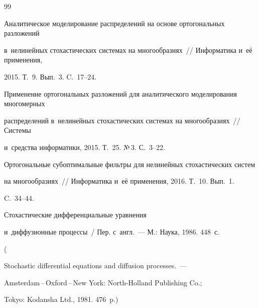 {\small\frenchspacing

{%


\begin{thebibliography}{99}



\vspace*{-2pt}





Аналитическое моделирование распределений на основе ортогональных разложений 

в~нелинейных стохастических системах на многообразиях~/\!\!/ Информатика и~её применения, 

2015. Т.~9. Вып.~3. C.~17--24.







Применение ортогональных разложений для аналитического моделирования многомерных 

распределений в~нелинейных стохастических системах на многообразиях~/\!\!/ Системы 

и~средства информатики, 2015. Т.~25. №\,3. С.~3--22.





Ортогональные субоптимальные фильтры для нелинейных стохастических систем 

на многообразиях~/\!\!/ Информатика и~её применения, 2016. Т.~10. Вып.~1.

C.~34--44.




 Стохастические дифференциальные уравнения 

и~диффузионные процессы~/ Пер. с~англ.~--- М.: Наука, 1986. 448~с.

( 

Stochastic differential equations and diffusion processes.~--- 

Amsterdam\,--\,Oxford\,--\,New York: North-Holland Publishing Co.; 

Tokyo: Kodansha Ltd., 1981. 476~p.)




\end{thebibliography}}}
